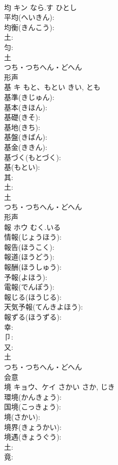 \documentclass[8pt]{extreport}
\begin{document}
\begin{CJK}{UTF8}{min}
\\	均	キン	なら.す	ひとし	
\\	平均(へいきん): 
\\	均衡(きんこう): 
\\	土: 
\\	匀: 
\\	土	
\\	つち・つちへん・どへん	
\\	形声 
\\	基	キ	もと、もとい	きい, とも	
\\	基準(きじゅん): 
\\	基本(きほん): 
\\	基礎(きそ): 
\\	基地(きち): 
\\	基盤(きばん): 
\\	基金(ききん): 
\\	基づく(もとづく): 
\\	基(もとい): 
\\	其: 
\\	土: 
\\	土	
\\	つち・つちへん・どへん	
\\	形声 
\\	報	ホウ	むく.いる		
\\	情報(じょうほう): 
\\	報告(ほうこく): 
\\	報道(ほうどう): 
\\	報酬(ほうしゅう): 
\\	予報(よほう): 
\\	電報(でんぽう): 
\\	報じる(ほうじる): 
\\	天気予報(てんきよほう): 
\\	報ずる(ほうずる): 
\\	幸: 
\\	卩: 
\\	又: 
\\	土	
\\	つち・つちへん・どへん	
\\	会意 
\\	境	キョウ、ケイ	さかい	さか, じき	
\\	環境(かんきょう): 
\\	国境(こっきょう): 
\\	境(さかい): 
\\	境界(きょうかい): 
\\	境遇(きょうぐう): 
\\	土: 
\\	竟: 

\end{CJK}
\end{document}
